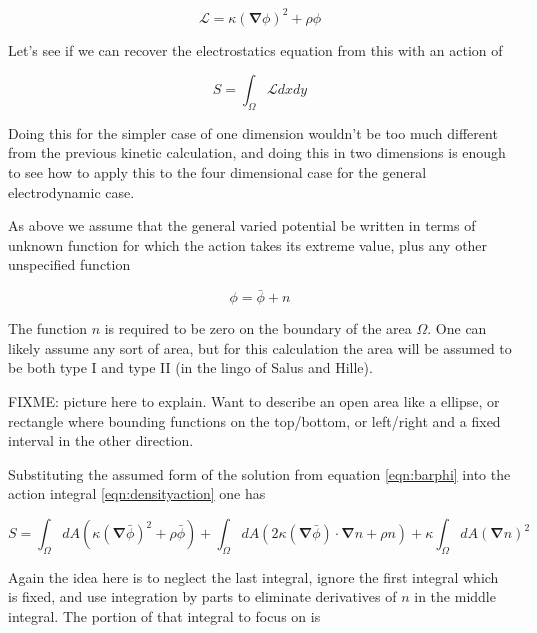 \documentclass{article}
\newcommand{\LL}[0]{\mathcal{L}}
\newcommand{\spacegrad}[0]{\boldsymbol{\nabla}}
\begin{document}
\begin{equation*}
\LL = \kappa (\spacegrad \phi)^2 + \rho \phi
\end{equation*}

Let's see if we can recover the electrostatics equation from this with an action of

\begin{equation}\label{eqn:densityaction}
S = \int_{\Omega} \LL dx dy
\end{equation}

Doing this for the simpler case of one dimension wouldn't be too much different from the previous kinetic calculation, and doing this in two dimensions is enough
to see how to apply this to the four dimensional case for the general electrodynamic case.

As above we assume that the general varied potential be written in terms of unknown function for which the action takes its extreme value, plus any other unspecified
function

\begin{equation}\label{eqn:barphi}
\phi = \bar{\phi} + n
\end{equation}

The function $n$ is required to be zero on the boundary of the area $\Omega$.  One can likely assume any sort of area, but for this calculation
the area will be assumed to be both type I and type II (in the lingo of Salus and Hille).

FIXME: picture here to explain.  Want to describe an open area like a ellipse, or rectangle where bounding functions on the top/bottom, or left/right and a fixed interval
in the other direction.


Substituting the assumed form of the solution from equation \ref{eqn:barphi} into the action integral \ref{eqn:densityaction} one has

\begin{equation*}
S =
    \int_{\Omega} dA \left( \kappa {(\spacegrad \bar{\phi})}^2 + \rho \bar{\phi} \right)
+   \int_{\Omega} dA \left( 2 \kappa (\spacegrad \bar{\phi}) \cdot \spacegrad n + \rho n \right)
+   \kappa \int_{\Omega} dA {(\spacegrad n)}^2
\end{equation*}

Again the idea here is to neglect the last integral, ignore the first integral which is fixed, and use integration by parts to eliminate derivatives of $n$
in the middle integral.  The portion of that integral to focus on is
\end{document}
